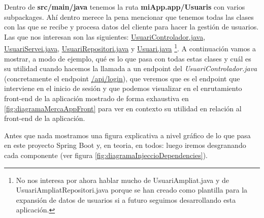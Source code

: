 \documentclass[a4paper,12pt]{report}
\begin{document}
				
				Dentro de \textbf{src/main/java} tenemos la ruta \textbf{miApp.app/Usuaris} con varios subpackages. Ahí dentro merece la pena mencionar que tenemos todas las clases con las que se recibe y procesa datos del cliente para hacer la gestión de usuarios. Las que nos interesan son las siguientes:
				\href{https://github.com/blackcub3s/mercApp/blob/main/APP%20WEB/__springboot__produccio__/app/src/main/java/miApp/app/Usuaris/controlador/UsuariControlador.java}{UsuariControlador.java}, 
				\href{https://github.com/blackcub3s/mercApp/blob/main/APP%20WEB/__springboot__produccio__/app/src/main/java/miApp/app/Usuaris/servei/UsuariServei.java}{UsuariServei.java}, 
				\href{https://github.com/blackcub3s/mercApp/blob/main/APP%20WEB/__springboot__produccio__/app/src/main/java/miApp/app/Usuaris/repositori/UsuariRepositori.java}{UsuariRepositori.java} y 
				\href{https://github.com/blackcub3s/mercApp/blob/main/APP%20WEB/__springboot__produccio__/app/src/main/java/miApp/app/Usuaris/model/Usuari.java}{Usuari.java}
				\footnote{No nos interesa por ahora hablar mucho de UsuariAmpliat.java y de UsuariAmpliatRepositori.java porque se han creado como plantilla para la expansión de datos de usuarios si a futuro seguimos desarrollando esta aplicación.}. 
				A continuación  vamos a mostrar, a modo de ejemplo, qué es lo que pasa con todas estas clases y cuál es su utilidad cuando hacemos la llamada a un endpoint del \textit{UsuariControlador.java} (concretamente el endpoint \href{https://github.com/blackcub3s/mercApp/blob/78c9f573613d94a9d9de6ee046aa5d6f02f0f425/APP%20WEB/__springboot__produccio__/app/src/main/java/miApp/app/Usuaris/controlador/UsuariControlador.java#L103}{/api/login}), que veremos que es el endpoint que interviene en el inicio de sesión y que podemos visualizar en el enrutamiento front-end de la aplicación mostrado de forma exhaustiva en \ref{fig:diagramaMercaAppFront} para ver en contexto su utilidad en relación al front-end de la aplicación.
				
				 Antes que nada mostramos una figura explicativa a nivel gráfico de lo que pasa en este proyecto Spring Boot y, en teoria, en todos: luego iremos desgranando cada componente (ver figura \ref{fig:diagramaInjeccioDependencies}).
				
				
							
\end{document}
